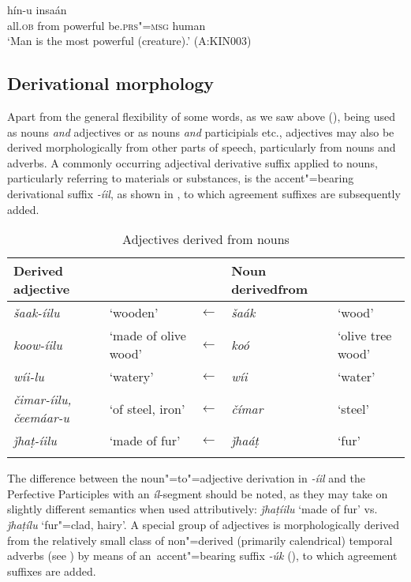 {\begin{exe}
\ex
\label{ex:6-9}
 hín-u insaán \\
all.\textsc{ob} from powerful be.\textsc{prs"=msg} human \\
\glt `Man is the most powerful (creature).' (A:KIN003)
\end{exe}

\subsection{Derivational morphology}
\label{subsec:6-3-4}

Apart from the general flexibility of some words, as we saw above (), being used as nouns \textit{and} adjectives or as nouns \textit{and} participials etc., adjectives may also be derived morphologically from other parts of speech, particularly from nouns and adverbs. A commonly occurring adjectival derivative suffix applied to nouns, particularly referring to materials or substances, is the accent"=bearing derivational suffix \textit{-íil}, as shown in , to which agreement suffixes are subsequently added.


\begin{table}[ht]
\caption{Adjectives derived from nouns}
\begin{tabularx}{\textwidth}{ Q l l P{22mm} l }
\lsptoprule
Derived adjective &
&
&
Noun derived\newline from &
\\\hline
\textit{šaak-íilu} &
`wooden' &
$\leftarrow$ &
\textit{šaák} &
`wood'\\
\textit{koow-íilu} &
`made of olive wood' &
$\leftarrow$ &
\textit{koó} &
`olive tree wood'\\
\textit{wíi-lu} &
`watery' &
$\leftarrow$ &
\textit{wíi} &
`water'\\
\textit{čimar-íilu, čeemáar-u} &
`of steel, iron' &
$\leftarrow$ &
\textit{čímar} &
`steel'\\
\textit{ǰhaṭ-íilu} &
`made of fur' &
$\leftarrow$ &
\textit{ǰhaáṭ} &
`fur'\\\lspbottomrule
\end{tabularx}
\label{tab:6-5}
\end{table}


The difference between the noun"=to"=adjective derivation in \textit{-íil} and the Perfective Participles with an \textit{íl}-segment should be noted, as they may take on slightly different semantics when used attributively: \textit{ǰhaṭíilu} `made of fur' vs. \textit{ǰhaṭílu} `fur"=clad, hairy'. A special group of adjectives is morphologically derived from the relatively small class of non"=derived (primarily calendrical) temporal adverbs (see ) by means of an~accent"=bearing suffix \textit{-úk} (), to which agreement suffixes are added.


}
